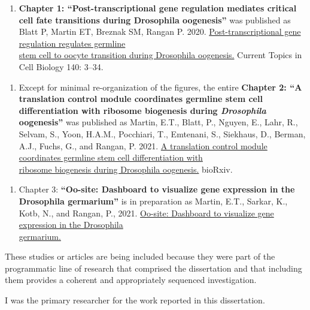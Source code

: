 \documentclass[
]{article}
\author{}
\date{\vspace{-2.5em}}
\providecommand{\tightlist}{%
  \setlength{\itemsep}{0pt}\setlength{\parskip}{0pt}}
\begin{document}

\begin{enumerate}
\def\labelenumi{\arabic{enumi}.}
\tightlist
\item
  \textbf{Chapter 1: ``Post-transcriptional gene regulation mediates
  critical cell fate transitions during Drosophila oogenesis''} was
  published as Blatt P, Martin ET, Breznak SM, Rangan P. 2020.
  \underline{Post-transcriptional gene regulation regulates germline}\\
  \underline{stem cell to oocyte transition during Drosophila
  oogenesis.} Current Topics in Cell Biology 140: 3--34.
\end{enumerate}

\newline
\newline

\begin{enumerate}
\def\labelenumi{\arabic{enumi}.}
\setcounter{enumi}{1}
\tightlist
\item
  Except for minimal re-organization of the figures, the entire
  \textbf{Chapter 2: ``A translation control module coordinates germline
  stem cell differentiation with ribosome biogenesis during
  \emph{Drosophila} oogenesis''} was published as Martin, E.T., Blatt,
  P., Nguyen, E., Lahr, R., Selvam, S., Yoon, H.A.M., Pocchiari, T.,
  Emtenani, S., Siekhaus, D., Berman, A.J., Fuchs, G., and Rangan, P.
  2021. \underline{A translation control module coordinates germline
  stem cell differentiation with}\\
  \underline{ribosome biogenesis during Drosophila oogenesis.} bioRxiv.
\end{enumerate}

\newline
\newline

\begin{enumerate}
\def\labelenumi{\arabic{enumi}.}
\setcounter{enumi}{2}
\tightlist
\item
  Chapter 3: \textbf{``Oo-site: Dashboard to visualize gene expression
  in the Drosophila germarium''} is in preparation as Martin, E.T.,
  Sarkar, K., Kotb, N., and Rangan, P., 2021. \underline{Oo-site:
  Dashboard to visualize gene expression in the Drosophila}\\
  \underline{germarium.}
\end{enumerate}

\newline
\newline

These studies or articles are being included because they were part of
the programmatic line of research that comprised the dissertation and
that including them provides a coherent and appropriately sequenced
investigation.

\newline

I was the primary researcher for the work reported in this dissertation.
\end{document}
